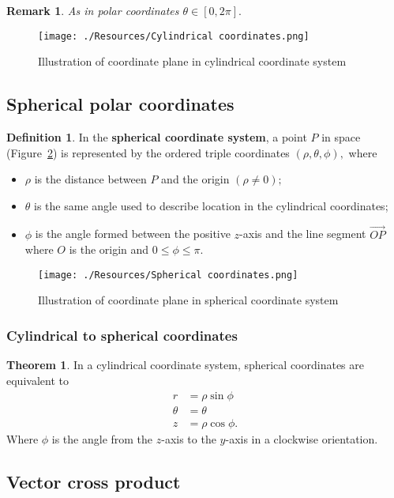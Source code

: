\documentclass[12pt, a4paper]{article}
\newtheorem*{remark}{Remark}
\theoremstyle{definition}
\newtheorem{definition}{Definition}[section]
\newtheorem{theorem}{Theorem}[section]
\theoremstyle{plain}
\begin{document}
\begin{remark}
As in polar coordinates $\theta \in [0,2\pi].$
\end{remark}

\begin{figure}[H]
\centering
\texttt{[image: ./Resources/Cylindrical coordinates.png]}
\caption{Illustration of coordinate plane in cylindrical coordinate system}
\label{fig:cylindrical coordinates}
\end{figure}

\subsection{Spherical polar coordinates}

\begin{definition}
In the \textbf{spherical coordinate system}, a point $P$ in space (Figure~\ref{fig:spherical coordinates}) is represented by the ordered triple coordinates $(\rho, \theta, \phi),$ where \begin{itemize}

	\item $\rho$ is the distance between $P$ and the origin $(\rho\neq0);$

	\item $\theta$ is the same angle used to describe location in the cylindrical coordinates;

	\item $\phi$ is the angle formed between the positive $z$-axis and the line segment $\overrightarrow{OP}$ where $O$ is the origin and $0\leq \phi \leq \pi.$

\end{itemize}
\end{definition}

\begin{figure}[H]
\centering
\texttt{[image: ./Resources/Spherical coordinates.png]}
\caption{Illustration of coordinate plane in spherical coordinate system}
\label{fig:spherical coordinates}
\end{figure}

\subsubsection{Cylindrical to spherical coordinates}

\begin{theorem}
In a cylindrical coordinate system, spherical coordinates are equivalent to $$\begin{aligned}
r&=\rho\sin\phi \\
\theta &=\theta \\
z&=\rho \cos\phi. 
\end{aligned}$$ Where $\phi$ is the angle from the $z$-axis to the $y$-axis in a clockwise orientation.
\end{theorem}

\subsection{Vector cross product}


\end{document}

